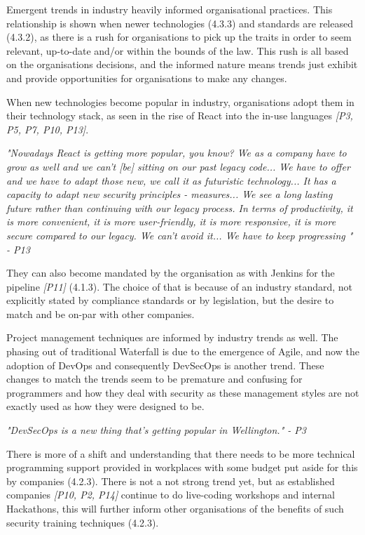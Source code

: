 Emergent trends in industry heavily informed organisational practices. This relationship is shown when newer technologies (4.3.3) and standards are released (4.3.2), as there is a rush for organisations to pick up the traits in order to seem relevant, up-to-date and/or within the bounds of the law. This rush is all based on the organisations decisions, and the informed nature means trends just exhibit and provide opportunities for organisations to make any changes. 
\newline
\par When new technologies become popular in industry, organisations adopt them in their technology stack, as seen in the rise of React into the in-use languages \textit{[P3, P5, P7, P10, P13]}. 
\newline
\par 
\textit{"Nowadays React is getting more popular, you know? We as a company have to grow as well and we can't [be] sitting on our past legacy code... We have to offer and we have to adapt those new, we call it as futuristic technology... It has a capacity to adapt new security principles - measures... We see a long lasting future rather than continuing with our legacy process. In terms of productivity, it is more convenient, it is more user-friendly, it is more responsive, it is more secure compared to our legacy. We can't avoid it... We have to keep progressing " - P13 }
\newline
\par
They can also become mandated by the organisation as with Jenkins for the pipeline \textit{[P11]} (4.1.3). The choice of that is because of an industry standard, not explicitly stated by compliance standards or by legislation, but the desire to match and be on-par with other companies.
\newline
\par 
Project management techniques are informed by industry trends as well. The phasing out of traditional Waterfall is due to the emergence of Agile, and now the adoption of DevOps and consequently DevSecOps is another trend. These changes to match the trends seem to be premature and confusing for programmers and how they deal with security as these management styles are not exactly used as how they were designed to be. 
\newline
\par
\textit{"DevSecOps is a new thing that's getting popular in Wellington." - P3}
\newline
\par
There is more of a shift and understanding that there needs to be more technical programming support provided in workplaces with some budget put aside for this by companies (4.2.3). There is not a not strong trend yet, but as established companies \textit{[P10, P2, P14]} continue to do live-coding workshops and internal Hackathons, this will further inform other organisations of the benefits of such security training techniques (4.2.3). 

